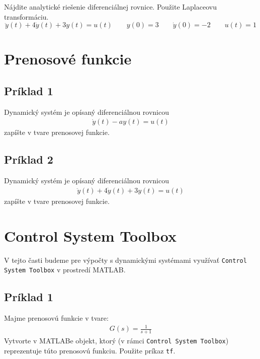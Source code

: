 \documentclass[a4paper, 10pt, ]{article}
\begin{document}
Nájdite analytické riešenie diferenciálnej rovnice. Použite Laplaceovu transformáciu.
\begin{equation} 
    \ddot y(t) + 4 \dot y(t) + 3y(t) = u(t)    \qquad y(0) = 3 \qquad \dot y(0) = -2  \qquad u(t) = 1 
\end{equation}




\section{Prenosové funkcie}


\subsection{Príklad 1}

Dynamický systém je opísaný diferenciálnou rovnicou
\begin{align}
    \dot y(t) - a y(t) = u(t) 
\end{align}
zapíšte v tvare prenosovej funkcie.





\subsection{Príklad 2}

Dynamický systém je opísaný diferenciálnou rovnicou
\begin{align}
    \ddot y(t) + 4 \dot y(t) + 3y(t) = u(t)
\end{align}
zapíšte v tvare prenosovej funkcie.



\section{Control System Toolbox}

V tejto časti budeme pre výpočty s dynamickými systémami využívať \texttt{Control System Toolbox} v prostredí MATLAB.





\subsection{Príklad 1}

Majme prenosovú funkcie v tvare:
\begin{align}
    G(s) = \frac{1}{s+1}
\end{align}
Vytvorte v MATLABe objekt, ktorý (v rámci \texttt{Control System Toolbox}) reprezentuje túto prenosovú funkciu. Použite príkaz \lstinline|tf|.
\end{document}
